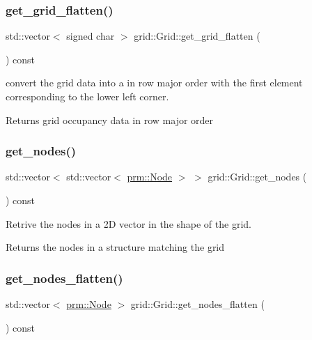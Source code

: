 \subsubsection{\texorpdfstring{get\+\_\+grid\+\_\+flatten()}{get\_grid\_flatten()}}
{\footnotesize\ttfamily std\+::vector$<$ signed char $>$ grid\+::\+Grid\+::get\+\_\+grid\+\_\+flatten (\begin{DoxyParamCaption}{ }\end{DoxyParamCaption}) const}



convert the grid data into a in row major order with the first element corresponding to the lower left corner. 

\begin{DoxyReturn}{Returns}
grid occupancy data in row major order 
\end{DoxyReturn}
\mbox{\label{classgrid_1_1Grid_a28e01687d0e3e922607e67b3d1d862b6}} 
\subsubsection{\texorpdfstring{get\+\_\+nodes()}{get\_nodes()}}
{\footnotesize\ttfamily std\+::vector$<$ std\+::vector$<$ \hyperlink{structprm_1_1Node}{prm\+::\+Node} $>$ $>$ grid\+::\+Grid\+::get\+\_\+nodes (\begin{DoxyParamCaption}{ }\end{DoxyParamCaption}) const}



Retrive the nodes in a 2D vector in the shape of the grid. 

\begin{DoxyReturn}{Returns}
the nodes in a structure matching the grid 
\end{DoxyReturn}
\mbox{\label{classgrid_1_1Grid_adc6f8296117527ab16f352806e9dc1d6}} 
\subsubsection{\texorpdfstring{get\+\_\+nodes\+\_\+flatten()}{get\_nodes\_flatten()}}
{\footnotesize\ttfamily std\+::vector$<$ \hyperlink{structprm_1_1Node}{prm\+::\+Node} $>$ grid\+::\+Grid\+::get\+\_\+nodes\+\_\+flatten (\begin{DoxyParamCaption}{ }\end{DoxyParamCaption}) const}



